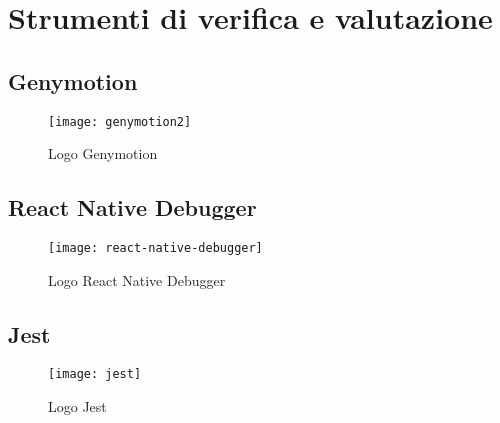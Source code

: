 \section{Strumenti di verifica e valutazione}
\subsection{Genymotion}
\begin{figure}[H] 
	\centering
	\texttt{[image: genymotion2]}
	\caption{Logo Genymotion}
	
\end{figure}
\subsection{React Native Debugger}
\begin{figure}[H] 
	\centering
	\texttt{[image: react-native-debugger]}
	\caption{Logo React Native Debugger}
\end{figure}
\subsection{Jest}
\begin{figure}[H] 
	\centering
	\texttt{[image: jest]}
	\caption{Logo Jest}
\end{figure}
